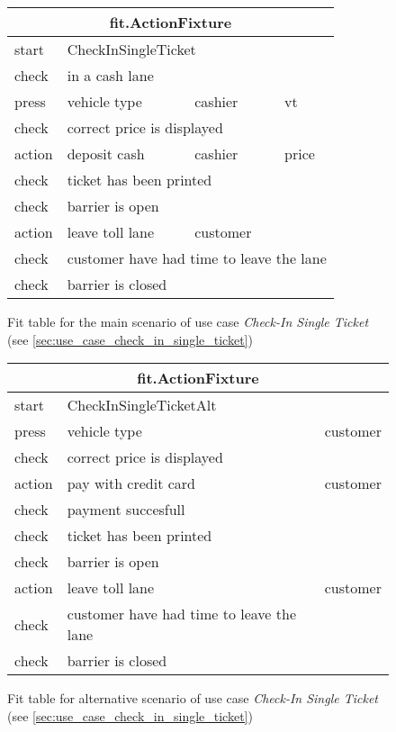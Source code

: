 \begin{figure}[H]
\centering
\begin{tabular}{|l|l|l|l|}
\hline 
\multicolumn{4}{|c|}{fit.ActionFixture}\tabularnewline
\hline
start & \multicolumn{3}{|l|}{CheckInSingleTicket}\tabularnewline 
\hline
check & \multicolumn{3}{|l|}{in a cash lane} \tabularnewline
\hline 
press & vehicle type & cashier & vt \tabularnewline
\hline 
check & \multicolumn{3}{|l|}{correct price is displayed} \tabularnewline
\hline 
action & deposit cash & cashier & price \tabularnewline
\hline 
check & \multicolumn{3}{|l|}{ticket has been printed} \tabularnewline
\hline 
check & \multicolumn{3}{|l|}{barrier is open} \tabularnewline
\hline 
action & leave toll lane & customer & \tabularnewline
\hline 
check & \multicolumn{3}{|l|}{customer have had time to leave the lane} \tabularnewline
\hline
check & \multicolumn{3}{|l|}{barrier is closed} \tabularnewline
\hline 
\end{tabular}
\caption{Fit table for the main scenario of use case \emph{Check-In Single Ticket} (see \autoref{sec:use_case_check_in_single_ticket})}
\end{figure}

\begin{figure}[H]
\centering
\begin{tabular}{|l|l|l|}
\hline 
\multicolumn{3}{|c|}{fit.ActionFixture}\tabularnewline
\hline 
start & CheckInSingleTicketAlt & \tabularnewline
\hline 
press & vehicle type & customer\tabularnewline
\hline 
check & correct price is displayed & \tabularnewline
\hline 
action & pay with credit card & customer\tabularnewline
\hline 
check & payment succesfull & \tabularnewline
\hline 
check & ticket has been printed & \tabularnewline
\hline 
check & barrier is open & \tabularnewline
\hline 
action & leave toll lane & customer\tabularnewline
\hline 
check & customer have had time to leave the lane & \tabularnewline
\hline
check & barrier is closed & \tabularnewline
\hline 
\end{tabular}
\caption{Fit table for alternative scenario of use case \emph{Check-In Single Ticket} (see \autoref{sec:use_case_check_in_single_ticket})}
\end{figure}
